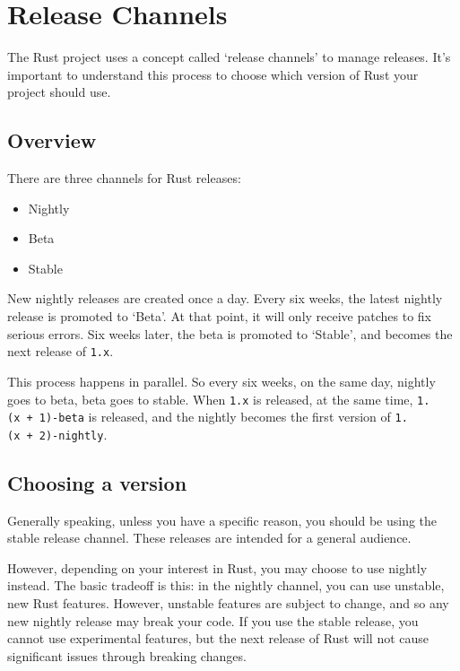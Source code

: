 \documentclass[a4paper,]{book}
\begin{document}
\section{Release Channels}\label{sec--release-channels}

The Rust project uses a concept called `release channels' to manage
releases. It's important to understand this process to choose which
version of Rust your project should use.

\subsection{Overview}\label{overview}

There are three channels for Rust releases:

\begin{itemize}
\itemsep1pt\parskip0pt
\item
  Nightly
\item
  Beta
\item
  Stable
\end{itemize}

New nightly releases are created once a day. Every six weeks, the latest
nightly release is promoted to `Beta'. At that point, it will only
receive patches to fix serious errors. Six weeks later, the beta is
promoted to `Stable', and becomes the next release of \texttt{1.x}.

This process happens in parallel. So every six weeks, on the same day,
nightly goes to beta, beta goes to stable. When \texttt{1.x} is
released, at the same time, \texttt{1.(x\ +\ 1)-beta} is released, and
the nightly becomes the first version of \texttt{1.(x\ +\ 2)-nightly}.

\subsection{Choosing a version}\label{choosing-a-version}

Generally speaking, unless you have a specific reason, you should be
using the stable release channel. These releases are intended for a
general audience.

However, depending on your interest in Rust, you may choose to use
nightly instead. The basic tradeoff is this: in the nightly channel, you
can use unstable, new Rust features. However, unstable features are
subject to change, and so any new nightly release may break your code.
If you use the stable release, you cannot use experimental features, but
the next release of Rust will not cause significant issues through
breaking changes.
\end{document}
